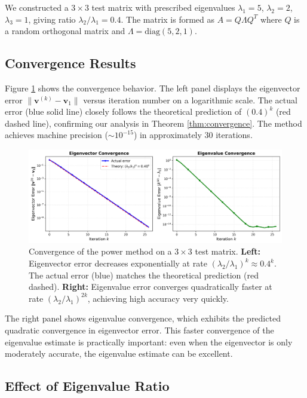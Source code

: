 \documentclass[11pt,a4paper]{article}
\begin{document}
We constructed a $3 \times 3$ test matrix with prescribed eigenvalues $\lambda_1 = 5$, $\lambda_2 = 2$, $\lambda_3 = 1$, giving ratio $\lambda_2/\lambda_1 = 0.4$. The matrix is formed as $A = Q\Lambda Q^T$ where $Q$ is a random orthogonal matrix and $\Lambda = \text{diag}(5, 2, 1)$.

\subsection{Convergence Results}

Figure \ref{fig:convergence} shows the convergence behavior. The left panel displays the eigenvector error $\|\mathbf{v}^{(k)} - \mathbf{v}_1\|$ versus iteration number on a logarithmic scale. The actual error (blue solid line) closely follows the theoretical prediction of $(0.4)^k$ (red dashed line), confirming our analysis in Theorem \ref{thm:convergence}. The method achieves machine precision ($\sim 10^{-15}$) in approximately 30 iterations.

\begin{figure}[h]
\centering
\includegraphics[width=\textwidth]{power_method_convergence.png}
\caption{Convergence of the power method on a $3 \times 3$ test matrix. \textbf{Left:} Eigenvector error decreases exponentially at rate $(\lambda_2/\lambda_1)^k \approx 0.4^k$. The actual error (blue) matches the theoretical prediction (red dashed). \textbf{Right:} Eigenvalue error converges quadratically faster at rate $(\lambda_2/\lambda_1)^{2k}$, achieving high accuracy very quickly.}
\label{fig:convergence}
\end{figure}

The right panel shows eigenvalue convergence, which exhibits the predicted quadratic convergence in eigenvector error. This faster convergence of the eigenvalue estimate is practically important: even when the eigenvector is only moderately accurate, the eigenvalue estimate can be excellent.

\subsection{Effect of Eigenvalue Ratio}
\end{document}
